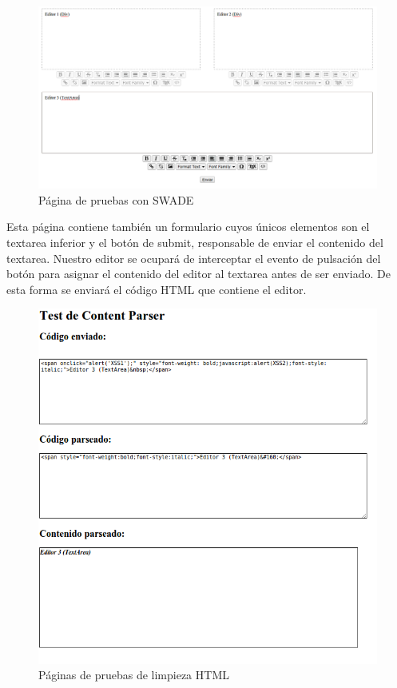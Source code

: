 \begin{figure}[h!]
  \centering
      \includegraphics[width=7in]{fig/result_testpage1}
  \caption{Página de pruebas con SWADE}
  \label{fig:result_testpage1}

\end{figure}


Esta página contiene también un formulario cuyos únicos elementos son el textarea inferior y el botón de submit, responsable de enviar el contenido del textarea. Nuestro editor se ocupará de interceptar el evento de pulsación del botón para asignar el contenido del editor al textarea antes de ser enviado. De esta forma se enviará el código HTML que contiene el editor.

\begin{figure}[h!]
  \centering
      \includegraphics[width=5in]{fig/result_testpage2}
  \caption{Páginas de pruebas de limpieza HTML}
  \label{fig:result_testpage2}
\end{figure}

